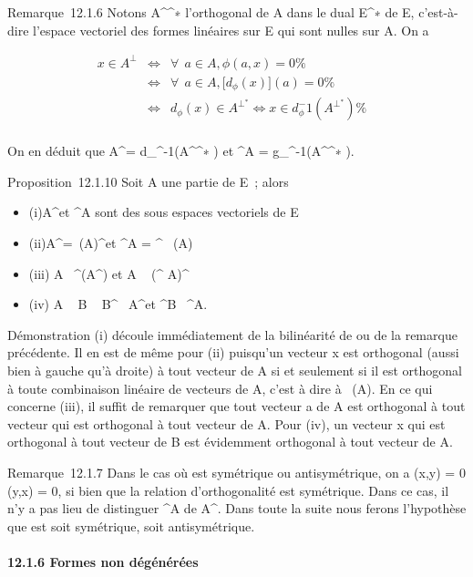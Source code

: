 \documentclass[]{article}
\begin{document}
Remarque~12.1.6 Notons A^\bot^∗  l'orthogonal de A
dans le dual E^∗ de E, c'est-à-dire l'espace vectoriel des
formes linéaires sur E qui sont nulles sur A. On a

\begin{align*} x \in A^\bot&
\Leftrightarrow & \forall~~a \in A, \phi(a,x)
= 0 \%& \\ &
\Leftrightarrow & \forall~~a \in A,
\big [d_\phi(x)\big ](a) = 0
\%& \\ & \Leftrightarrow &
d_\phi(x) \in A^\bot^∗ 
\Leftrightarrow x \in
d_\phi^-1(A^\bot^∗ )\%&
\\ \end{align*}

On en déduit que A^\bot =
d_\phi^-1(A^\bot^∗ ) et ^\bot A
= g_\phi^-1(A^\bot^∗ ).

Proposition~12.1.10 Soit A une partie de E~; alors

\begin{itemize}
\itemsep1pt\parskip0pt
\item
  (i)A^\bot et ^\bot A sont des sous espaces vectoriels
  de E
\item
  (ii)A^\bot =\
  \mathrmVect(A)^\bot et ^\bot A
  = ^\bot
  \mathrmVect~(A)
\item
  (iii) A \subset~^\bot (A^\bot) et A \subset~ (^\bot
  A)^\bot
\item
  (iv) A \subset~ B \rigtharrow~ B^\bot\subset~ A^\bot et ^\bot B
  \subset~^\bot A.
\end{itemize}

Démonstration (i) découle immédiatement de la bilinéarité de \phi ou de la
remarque précédente. Il en est de même pour (ii) puisqu'un vecteur x est
orthogonal (aussi bien à gauche qu'à droite) à tout vecteur de A si et
seulement si il est orthogonal à toute combinaison linéaire de vecteurs
de A, c'est à dire à
\mathrmVect~(A). En ce qui
concerne (iii), il suffit de remarquer que tout vecteur a de A est
orthogonal à tout vecteur qui est orthogonal à tout vecteur de A. Pour
(iv), un vecteur x qui est orthogonal à tout vecteur de B est évidemment
orthogonal à tout vecteur de A.

Remarque~12.1.7 Dans le cas où \phi est symétrique ou antisymétrique, on a
\phi(x,y) = 0 \Leftrightarrow \phi(y,x) = 0, si bien que la
relation d'orthogonalité est symétrique. Dans ce cas, il n'y a pas lieu
de distinguer ^\bot A de A^\bot. Dans toute la suite
nous ferons l'hypothèse que \phi est soit symétrique, soit antisymétrique.

\paragraph{12.1.6 Formes non dégénérées}
\end{document}
